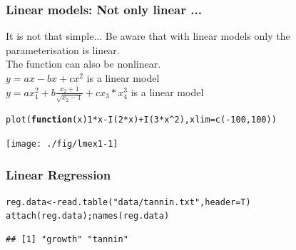 \documentclass[xcolor=table, xcolor=dvipsnames]{beamer}\usepackage[]{graphicx}\usepackage[]{color}
\makeatletter
\newcommand{\hlnum}[1]{\textcolor[rgb]{0,0,0}{#1}}
\newcommand{\hlstr}[1]{\textcolor[rgb]{0.545,0.137,0.137}{#1}}
\newcommand{\hlopt}[1]{\textcolor[rgb]{0,0,0}{#1}}
\newcommand{\hlstd}[1]{\textcolor[rgb]{0,0,0}{#1}}
\newcommand{\hlkwa}[1]{\textcolor[rgb]{1,0,0}{\textbf{#1}}}
\newcommand{\hlkwb}[1]{\textcolor[rgb]{0,0,0}{#1}}
\newcommand{\hlkwc}[1]{\textcolor[rgb]{1,0,1}{#1}}
\newcommand{\hlkwd}[1]{\textcolor[rgb]{0,0,1}{#1}}
\newenvironment{kframe}{%
 \def\at@end@of@kframe{}%
 \ifinner\ifhmode%
  \def\at@end@of@kframe{\end{minipage}}%
  \begin{minipage}{\columnwidth}%
 \fi\fi%
 \def\FrameCommand##1{\hskip\@totalleftmargin \hskip-\fboxsep
 \colorbox{shadecolor}{##1}\hskip-\fboxsep
     \hskip-\linewidth \hskip-\@totalleftmargin \hskip\columnwidth}%
 \MakeFramed {\advance\hsize-\width
   \@totalleftmargin\z@ \linewidth\hsize
   \@setminipage}}%
 {\par\unskip\endMakeFramed%
 \at@end@of@kframe}
\newenvironment{knitrout}{}{} %
\makeatother
\begin{document}
\begin{frame}[fragile]\frametitle{Linear models: Not only linear ...}
 \begin{block}{It is not that simple...}
 Be aware that with linear models only the parameterisation is linear.\\ The function can also be nonlinear.\\
 \(  y=ax -bx +cx^2  \) is a linear model\\
 \(  y=ax_1^2 +b \frac{x_2 + 1}{\sqrt{x_2-1}} +cx_3 *x_4^3  \) is a linear model\\
\end{block}
\begin{knitrout}
\color{fgcolor}\begin{kframe}
\begin{alltt}
\hlkwd{plot}\hlstd{(}\hlkwa{function}\hlstd{(}\hlkwc{x}\hlstd{)} \hlnum{1}\hlopt{*}\hlstd{x} \hlopt{-}\hlkwd{I}\hlstd{(}\hlnum{2}\hlopt{*}\hlstd{x)} \hlopt{+} \hlkwd{I}\hlstd{(}\hlnum{3}\hlopt{*}\hlstd{x}\hlopt{^}\hlnum{2}\hlstd{),} \hlkwc{xlim}\hlstd{=}\hlkwd{c}\hlstd{(}\hlopt{-}\hlnum{100}\hlstd{,} \hlnum{100}\hlstd{))}
\end{alltt}
\end{kframe}

{\centering \texttt{[image: ./fig/lmex1-1]} 

}



\end{knitrout}
\end{frame}


\begin{frame}[fragile]\frametitle{Linear Regression}
\begin{knitrout}
\color{fgcolor}\begin{kframe}
\begin{alltt}
\hlstd{reg.data} \hlkwb{<-} \hlkwd{read.table}\hlstd{(}\hlstr{"data/tannin.txt"}\hlstd{,}\hlkwc{header}\hlstd{=T)}
\hlkwd{attach}\hlstd{(reg.data);} \hlkwd{names}\hlstd{(reg.data)}
\end{alltt}
\begin{verbatim}
## [1] "growth" "tannin"
\end{verbatim}
\end{kframe}
\end{knitrout}
\end{frame}
\end{document}
